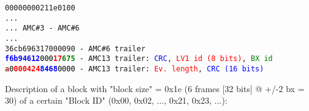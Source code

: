 \texttt{00000000211e0100}\\
\texttt{...}\\
\texttt{... AMC\#3 - AMC\#6}\\
\texttt{...}\\
\texttt{36cb696317000090 - AMC\#6 trailer}\\
\texttt{\textcolor{blue}{\textbf{f6b94612}}\textcolor{black}{000}\textcolor{red}{\textbf{17}}\textcolor{green}{\textbf{675}} - AMC13 trailer: \textcolor{blue}{CRC}, \textcolor{red}{LV1 id (8 bits)}, \textcolor{green}{BX id}}\\
\texttt{\textcolor{brown}{\textbf{a}}\textcolor{black}{0}\textcolor{red}{\textbf{000424}}\textcolor{blue}{\textbf{8468}}\textcolor{black}{0000} - AMC13 trailer: \textcolor{red}{Ev. length}, \textcolor{blue}{CRC (16 bits)}}\\

\clearpage

Description of a block with "block size" = 0x1e (6 frames [32 bits] @ +/-2 bx = 30) of a certain "Block ID" (0x00, 0x02, ..., 0x21, 0x23, ...):

